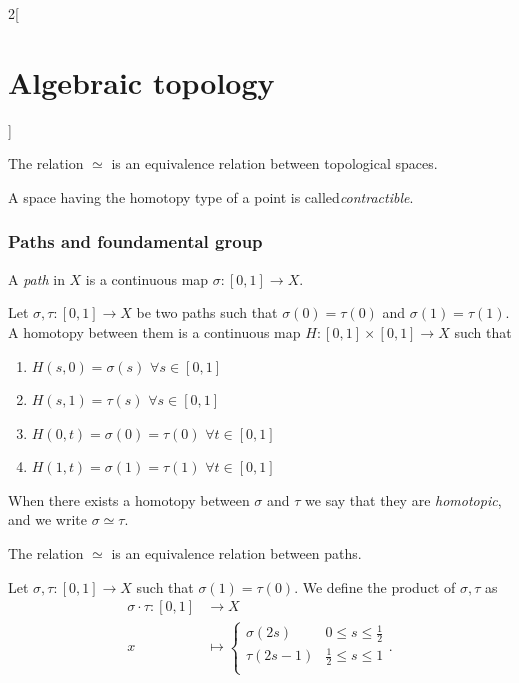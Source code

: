 \documentclass[../../../main_math.tex]{subfiles}
\begin{document}
\begin{multicols}{2}[\section{Algebraic topology}]
  	\begin{proposition}
		The relation $\simeq$ is an equivalence relation between topological spaces.
	\end{proposition}

	\begin{definition}
		A space having the homotopy type of a point is called\emph{contractible}.
	\end{definition}
	
	\subsubsection{Paths and foundamental group}
	
	\begin{definition}
		A \emph{path} in $X$ is a continuous map $\sigma:[0,1]\to X$.
	\end{definition}

	\begin{definition}
		Let $\sigma, \tau : [0,1]\to X$ be two paths such that $\sigma(0)=\tau(0)$ and $\sigma(1)=\tau(1)$. A homotopy between them is a continuous map $H:[0,1]\times [0,1] \to X$ such that
		\begin{enumerate}
			\item $H(s,0)=\sigma(s) $ $\forall s\in [0,1]$
			\item $H(s,1)=\tau(s)$ $\forall s\in [0,1]$
			\item $H(0,t)=\sigma(0)=\tau(0)$ $\forall t\in [0,1]$
			\item $H(1,t)=\sigma(1)=\tau(1)$ $\forall t\in [0,1]$
		\end{enumerate}
	When there exists a homotopy between $\sigma$ and $\tau$ we say that they are \emph{homotopic}, and we write $\sigma \simeq \tau $.
	\end{definition}

	\begin{proposition}
		The relation $\simeq$ is an equivalence relation between paths.
	\end{proposition}

	\begin{definition}
		Let $\sigma, \tau: [0,1] \to X$ such that $\sigma(1)=\tau(0)$. We define the product of $\sigma, \tau$ as 
		\begin{align*}
			\sigma \cdot \tau: [0,1] &\longrightarrow X \\
			x&\longmapsto \begin{cases}
				\sigma(2s) & 0\leq s \leq \frac{1}{2}\\
				\tau(2s-1)  & \frac{1}{2}\leq s \leq 1\\
			\end{cases}.
		\end{align*}
	

\end{definition}
\end{multicols}
\end{document}

